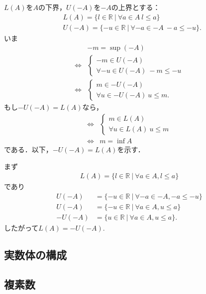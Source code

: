 \subsubsection{}
\begin{ans}
    $L(A)$を$A$の下界，$U(-A)$を$-A$の上界とする：
    \begin{align*}
        & L(A) = \{ l \in \mathbb{R} ~ | ~ \forall a \in A ~ l \leq a \}\\
        & U(-A) = \{ -u \in \mathbb{R} ~ | ~ \forall -a \in -A ~ -a \leq -u \}.
    \end{align*}
    いま
    \begin{align*}
        & -m = \sup (-A)\\
        \Leftrightarrow & \begin{cases}
            -m \in U(-A)\\
            \forall -u \in U(-A) ~ -m \leq -u
        \end{cases}\\
        \Leftrightarrow & \begin{cases}
            m \in -U(-A)\\
            \forall u \in -U(-A) ~ u \leq m.
        \end{cases}
    \end{align*}
    もし$-U(-A) = L(A)$なら，
    \begin{align*}
        \Leftrightarrow & \begin{cases}
            m \in L(A)\\
            \forall u \in L(A) ~ u \leq m
        \end{cases}\\
        \Leftrightarrow & m = \inf A
    \end{align*}
    である．以下，$-U(-A) = L(A)$を示す．

    まず
    \begin{align*}
        L(A) = \{l \in \mathbb{R} ~ | ~ \forall a \in A, l \leq a\}
    \end{align*}
    であり
    \begin{align}
        U(-A) &= \{-u \in \mathbb{R} ~ | ~ \forall -a \in -A, -a \leq -u\}\\
        U(-A) &= \{-u \in \mathbb{R} ~ | ~ \forall a \in A, u \leq a\}\\
        -U(-A) &= \{u \in \mathbb{R} ~ | ~ \forall a \in A, u \leq a\}.
    \end{align}
    したがって$L(A) = -U(-A)$.
\end{ans}


\subsection{実数体の構成}
\subsection{複素数}